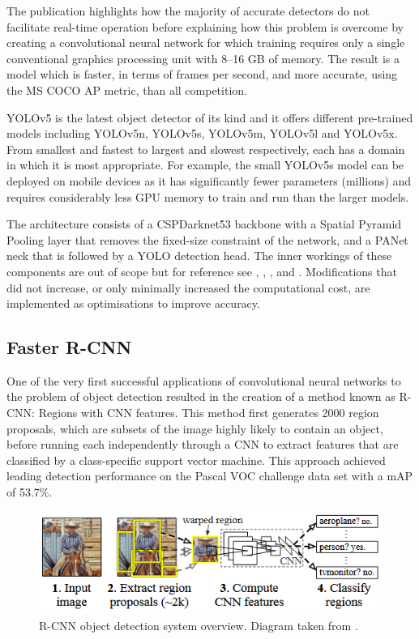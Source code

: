 \documentclass{thesis}
\begin{document}
The publication highlights how the majority of accurate detectors do not facilitate real-time operation before explaining how this problem is overcome by creating a convolutional neural network for which training requires only a single conventional graphics processing unit with 8--16 GB of memory. The result is a model which is faster, in terms of frames per second, and more accurate, using the MS COCO AP metric, than all competition.

YOLOv5 is the latest object detector of its kind and it offers different pre-trained models including YOLOv5n, YOLOv5s, YOLOv5m, YOLOv5l and YOLOv5x. From smallest and fastest to largest and slowest respectively, each has a domain in which it is most appropriate. For example, the small YOLOv5s model can be deployed on mobile devices as it has significantly fewer parameters (millions) and requires considerably less GPU memory to train and run than the larger models\cite{yolov5}.

The architecture consists of a CSPDarknet53 backbone with a Spatial Pyramid Pooling layer that removes the fixed-size constraint of the network, and a PANet neck that is followed by a YOLO detection head\cite{yolov1}. The inner workings of these components are out of scope but for reference see \cite{yolov5}, \cite{cspnet}, \cite{spp}, and \cite{panet}. Modifications that did not increase, or only minimally increased the computational cost, are implemented as optimisations to improve accuracy\cite{yolov4}.

\subsection{Faster R-CNN}

One of the very first successful applications of convolutional neural networks to the problem of object detection resulted in the creation of a method known as R-CNN: Regions with CNN features\cite{rcnn}. This method first generates 2000 region proposals, which are subsets of the image highly likely to contain an object, before running each independently through a CNN to extract features that are classified by a class-specific support vector machine. This approach achieved leading detection performance on the Pascal VOC challenge data set with a mAP of 53.7\%.

\begin{figure}[h]
    \centering
    \includegraphics[scale=0.75]{images/rcnn.png}
    \caption{R-CNN object detection system overview. Diagram taken from \cite{rcnn}.}
    \label{fig:faster-rcnn-architecture}
\end{figure}
\end{document}
